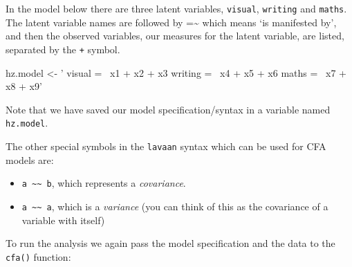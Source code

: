 \documentclass[]{article}
\newenvironment{Shaded}{\begin{snugshade}}{\end{snugshade}}
\newcommand{\StringTok}[1]{\textcolor[rgb]{0.31,0.60,0.02}{#1}}
\newcommand{\NormalTok}[1]{#1}
\theoremstyle{definition}
\theoremstyle{definition}
\theoremstyle{definition}
\theoremstyle{remark}
\begin{document}
In the model below there are three latent variables, \texttt{visual},
\texttt{writing} and \texttt{maths}. The latent variable names are
followed by =\textasciitilde{} which means `is manifested by', and then
the observed variables, our measures for the latent variable, are
listed, separated by the \texttt{+} symbol.

\begin{Shaded}
\begin{Highlighting}[]
\NormalTok{hz.model <-}\StringTok{ '}
\StringTok{visual =~ x1 + x2 + x3}
\StringTok{writing =~ x4 + x5 + x6}
\StringTok{maths =~ x7 + x8 + x9'}
\end{Highlighting}
\end{Shaded}

Note that we have saved our model specification/syntax in a variable
named \texttt{hz.model}.

The other special symbols in the \texttt{lavaan} syntax which can be
used for CFA models are:

\begin{itemize}
\item
  \texttt{a\ \textasciitilde{}\textasciitilde{}\ b}, which represents a
  \emph{covariance}.
\item
  \texttt{a\ \textasciitilde{}\textasciitilde{}\ a}, which is a
  \emph{variance} (you can think of this as the covariance of a variable
  with itself)
\end{itemize}

To run the analysis we again pass the model specification and the data
to the \texttt{cfa()} function:
\end{document}
